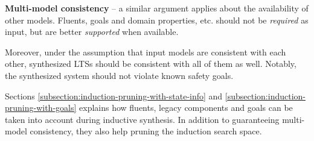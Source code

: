 \begin{description}
\item{\textbf{Multi-model consistency}} -- a similar argument applies about the availability of other models. Fluents, goals and domain properties, etc. should not be \emph{required} as input, but are better \emph{supported} when available. 

Moreover, under the assumption that input models are consistent with each other, synthesized LTSs should be consistent with all of them as well. Notably, the synthesized system should not violate known safety goals.

Sections \ref{subsection:induction-pruning-with-state-info} and \ref{subsection:induction-pruning-with-goals} explains how fluents, legacy components and goals can be taken into account during inductive synthesis. In addition to guaranteeing multi-model consistency, they also help pruning the induction search space.

\end{description}

